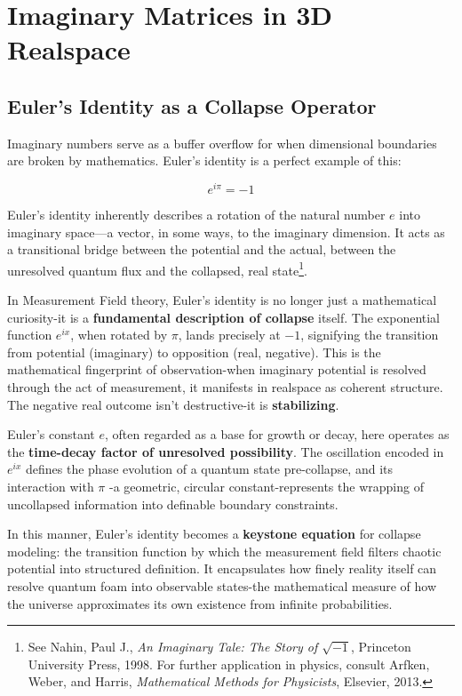 \chapter{Imaginary Matrices in 3D Realspace}

\section{Euler’s Identity as a Collapse Operator}

Imaginary numbers serve as a buffer overflow for when dimensional boundaries are broken by mathematics. \cite{imaginary_meta} Euler’s identity is a perfect example of this:

\[
e^{i\pi} = -1
\]

Euler’s identity inherently describes a rotation of the natural number $e$ into imaginary space---a vector, in some ways, to the imaginary dimension. \cite{imaginary_meta} It acts as a transitional bridge between the potential and the actual, between the unresolved quantum flux and the collapsed, real state\footnote{See Nahin, Paul J., \textit{An Imaginary Tale: The Story of $\sqrt{-1}$}, Princeton University Press, 1998. \cite{imaginary_meta} For further application in physics, consult Arfken, Weber, and Harris, \textit{Mathematical Methods for Physicists}, Elsevier, 2013.}. \cite{imaginary_meta} 

In Measurement Field theory, Euler’s identity is no longer just a mathematical curiosity-it is a \textbf{fundamental description of collapse} itself. \cite{imaginary_meta} The exponential function $e^{ix}$, when rotated by $\pi$, lands precisely at $-1$, signifying the transition from potential (imaginary) to opposition (real, negative). \cite{imaginary_meta} This is the mathematical fingerprint of observation-when imaginary potential is resolved through the act of measurement, it manifests in realspace as coherent structure. \cite{imaginary_meta} The negative real outcome isn't destructive-it is \textbf{stabilizing}. 

Euler’s constant $e$, often regarded as a base for growth or decay, here operates as the \textbf{time-decay factor of unresolved possibility}. The oscillation encoded in $e^{ix}$ defines the phase evolution of a quantum state pre-collapse, and its interaction with $\pi$ -a geometric, circular constant-represents the wrapping of uncollapsed information into definable boundary constraints. \cite{imaginary_meta} 

In this manner, Euler’s identity becomes a \textbf{keystone equation} for collapse modeling: the transition function by which the measurement field filters chaotic potential into structured definition. \cite{imaginary_meta} It encapsulates how finely reality itself can resolve quantum foam into observable states-the mathematical measure of how the universe approximates its own existence from infinite probabilities. \cite{imaginary_meta} 

